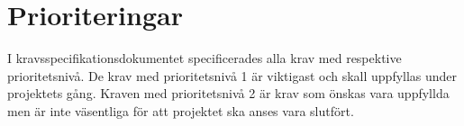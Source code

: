 \documentclass[projektplan/plan.tex]{subfiles}
\begin{document}
\section{Prioriteringar}
I kravsspecifikationsdokumentet specificerades alla krav med respektive
prioritetsnivå. De krav med prioritetsnivå 1 är viktigast och skall uppfyllas
under projektets gång. Kraven med prioritetsnivå 2 är krav som önskas vara
uppfyllda men är inte väsentliga för att projektet ska anses vara slutfört.
\end{document}
